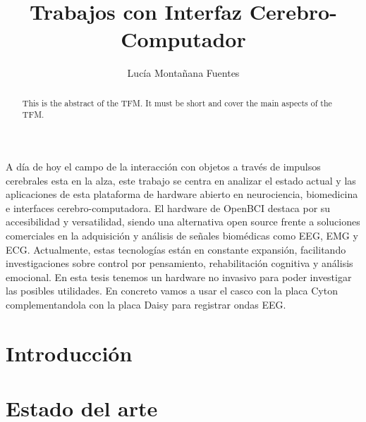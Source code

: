 \documentclass[twoside,spanish,a4paper,12pt]{tfg}
\title{Trabajos con Interfaz Cerebro-Computador}
\author{Lucía Montañana Fuentes}
\begin{document}
\portada
\cleardoublepage
\contraportada
\cleardoublepage
\declaracion
\cleardoublepage


\begin{resumen}
  A día de hoy el campo de la interacción con objetos a través de impulsos cerebrales esta en la alza, este trabajo se centra en analizar el estado actual y las aplicaciones de esta plataforma de hardware abierto en neurociencia, biomedicina e interfaces cerebro-computadora. El hardware de OpenBCI destaca por su accesibilidad y versatilidad, siendo una alternativa open source frente a soluciones comerciales en la adquisición y análisis de señales biomédicas como EEG, EMG y ECG. Actualmente, estas tecnologías están en constante expansión, facilitando investigaciones sobre control por pensamiento, rehabilitación cognitiva y análisis emocional. En esta tesis tenemos un hardware no invasivo para poder investigar las posibles utilidades. En concreto vamos a usar el casco con la placa Cyton complementandola con la placa Daisy para registrar ondas EEG.
\end{resumen}
\cleardoublepage

\begin{abstract}
  This is the abstract of the TFM. It must be short and cover the main aspects of the TFM.
\end{abstract}
\cleardoublepage

\cleardoublepage


\begin{agradecimientos}
 
\end{agradecimientos}
\cleardoublepage

\tableofcontents

\pagestyle{tfg}
\justify



\chapter{Introducción}


\chapter{Estado del arte}

\end{document}
